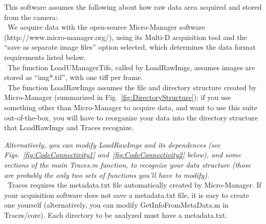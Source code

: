 \documentclass[11pt]{article}
\begin{document}
This software assumes the following about how raw data area acquired and stored from the camera:\\

\noindent \textbullet~We acquire data with the open-source Micro-Manager software (http://www.micro-manager.org/), using its Multi-D acquisition tool and the ``save as separate image files'' option selected, which determines the data format requirements listed below.
\\

\noindent \textbullet~The function LoadUManagerTifs, called by LoadRawImgs, assumes images are stored as ``img*.tif'', with one tiff per frame.\\

\noindent \textbullet~The function LoadRawImgs assumes the file and directory structure created by Micro-Manager (summarized in Fig.~\ref{fig:DirectoryStructure}); if you use something other than Micro-Manager to acquire data, and want to use this suite out-of-the-box, you will have to reorganize your data into the directory structure that LoadRawImgs and Traces recognize.  

{\it Alternatively, you can modify LoadRawImgs and its dependences (see Figs.~\ref{fig:CodeConnectivity1} and~\ref{fig:CodeConnectivity2} below), and some sections of the main Traces.m function, to recognize your data structure (those are probably the only two sets of functions you'll have to modify)}.  \\

\noindent \textbullet~Traces requires the metadata.txt file automatically created by Micro-Manager. If your acquisition software does not save a metadata.txt file, it is easy to create one yourself (alternatively, you can modify GetInfoFromMetaData.m in Traces/core). Each directory to be analyzed must have a metadata.txt. 
\end{document}
